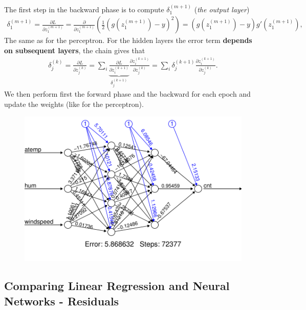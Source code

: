 \documentclass[aspectratio=169,10pt]{beamer}
\begin{document}
\begin{frame}{\secname}{\subsecname}
  The first step in the {\color{orange}backward phase} is to compute $\delta_1^{(m+1)}$ (\textit{the output layer})
  \begin{align}
    \delta_1^{(m+1)} = \frac{\partial L}{\partial z_1^{(m+1)}} = \frac{\partial}{\partial z_1^{(m+1)}} \left(\frac{1}{2}(g(z_1^{(m+1)}) - y)^2 \right) = \left(g(z_1^{(m+1)}) - y \right)g'(z_1^{(m+1)}),
  \end{align}
  The same as for the perceptron.
  For the hidden layers the error term \textbf{depends on subsequent layers}, the chain gives that
  \begin{align}
    \delta_j^{(k)} = \frac{\partial L}{\partial z_j^{(k)}} = \sum_i \underbrace{\frac{\partial L}{\partial z_i^{(k+1)}}}_{\delta_j^{(k+1)}} \frac{\partial z_i^{(k+1)}}{\partial z_j^{(k)}} = \sum_i \delta_j^{(k+1)} \frac{\partial z_i^{(k+1)}}{\partial z_j^{(k)}}.
  \end{align}
  We then perform first the forward phase and the backward for each epoch and update the weights (like for the perceptron).
\end{frame}

\begin{frame}{\secname}{\subsecname}
  \begin{figure}
    \includegraphics[width=.7\textwidth]{scripts/output/neural_network.pdf}
  \end{figure}
\end{frame}

\subsection{Comparing Linear Regression and Neural Networks - Residuals}
\end{document}
